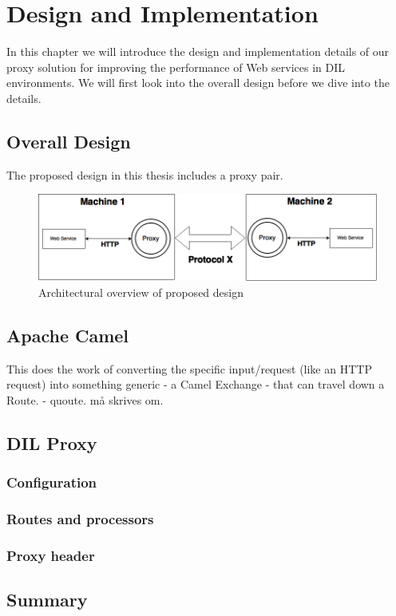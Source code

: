 \chapter{Design and Implementation}

In this chapter we will introduce the design and implementation details of our
proxy solution for improving the performance of Web services in DIL
environments. We will first look into the overall design before we dive into the
details.

\section{Overall Design}

The proposed design in this thesis includes a proxy pair.

\begin{figure}[h]
\includegraphics[scale=0.4]{images/architecture.png}
\caption{Architectural overview of proposed design}
\end{figure}

\section{Apache Camel}

This does the work of converting the specific input/request (like an HTTP
request) into something generic - a Camel Exchange - that can travel down a
Route.
 - quoute. må skrives om.


\section{DIL Proxy}

\subsection{Configuration}


\subsection{Routes and processors}

\subsection{Proxy header}




\section{Summary}
